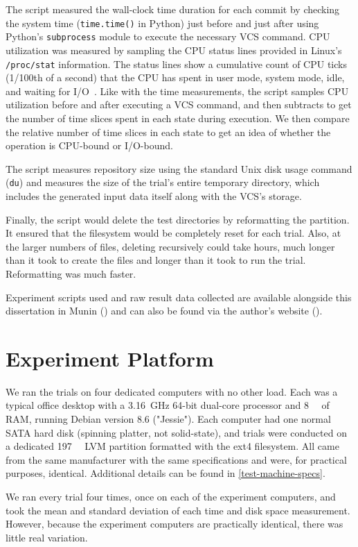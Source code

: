 The script measured the wall-clock time duration for each \gls{commit} by
checking the system time (\lstinline{time.time()} in Python) just before and
just after using Python's \lstinline{subprocess} module to execute the necessary
\gls{VCS} command. CPU utilization was measured by sampling the CPU status lines
provided in Linux's \lstinline{/proc/stat} information. The status lines show a
cumulative count of CPU ticks (\num{1/100}{th} of a second) that the CPU has
spent in user mode, system mode, idle, and waiting for I/O~\cite{proc_man_page}.
Like with the time measurements, the script samples CPU utilization before and
after executing a \gls{VCS} command, and then subtracts to get the number of
time slices spent in each state during execution. We then compare the relative
number of time slices in each state to get an idea of whether the operation is
CPU-bound or I/O-bound.

The script measures \gls{repository} size using the standard Unix disk usage
command (\lstinline{du}) and measures the size of the trial's entire temporary
directory, which includes the generated input data itself along with the
\gls{VCS}'s storage.

Finally, the script would delete the test directories by reformatting the
partition. It ensured that the filesystem would be completely reset for each
trial. Also, at the larger numbers of files, deleting recursively could take
hours, much longer than it took to create the files and longer than it took to
run the trial. Reformatting was much faster.


Experiment scripts used and raw result data collected are available alongside
this dissertation in Munin (\muninurl) and can also be found via the author's
website (\dmvurl).


\section{Experiment Platform}

We ran the trials on four dedicated computers with no other
load. Each was a typical office desktop with a \SI{3.16}{\giga\hertz}
\num{64}-bit dual-core processor and \SI{8}{\gibi\byte} of RAM, running Debian
version 8.6 ("Jessie"). Each computer had one normal SATA hard disk (spinning
platter, not solid-state), and trials were conducted on a dedicated
\SI{197}{\gibi\byte} LVM partition formatted with the ext4 filesystem. All came
from the same manufacturer with the same specifications and were, for practical purposes,
identical.
Additional details can be found in \autoref{test-machine-specs}.

We ran every trial four times, once on each of the experiment computers, and
took the mean and standard deviation of each time and disk space measurement.
However, because the experiment computers are practically identical, there was
little real variation.
